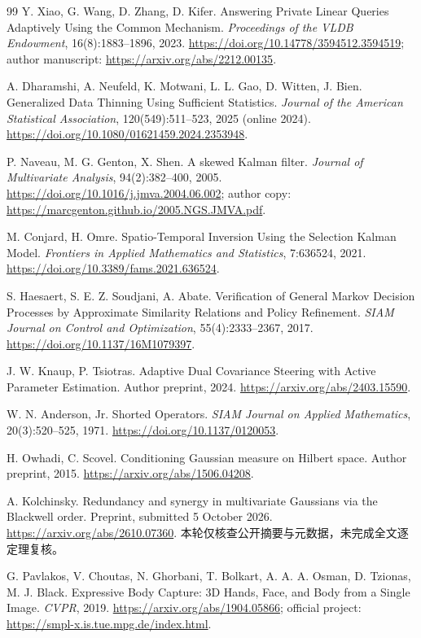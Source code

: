 \documentclass[UTF8,fontset=fandol,11pt,a4paper]{ctexart}
\theoremstyle{definition}\newtheorem{definition}[theorem]{定义}\newtheorem{assumption}[theorem]{条件}
\numberwithin{equation}{section}
\begin{document}
\begin{thebibliography}{99}
\small
{} Y. Xiao, G. Wang, D. Zhang, D. Kifer.
Answering Private Linear Queries Adaptively Using the Common Mechanism.
\emph{Proceedings of the VLDB Endowment}, 16(8):1883--1896, 2023.
\url{https://doi.org/10.14778/3594512.3594519}; author manuscript: \url{https://arxiv.org/abs/2212.00135}.

 A. Dharamshi, A. Neufeld, K. Motwani, L. L. Gao, D. Witten, J. Bien.
Generalized Data Thinning Using Sufficient Statistics.
\emph{Journal of the American Statistical Association}, 120(549):511--523, 2025 (online 2024).
\url{https://doi.org/10.1080/01621459.2024.2353948}.

 P. Naveau, M. G. Genton, X. Shen.
A skewed Kalman filter. \emph{Journal of Multivariate Analysis}, 94(2):382--400, 2005.
\url{https://doi.org/10.1016/j.jmva.2004.06.002}; author copy: \url{https://marcgenton.github.io/2005.NGS.JMVA.pdf}.

 M. Conjard, H. Omre.
Spatio-Temporal Inversion Using the Selection Kalman Model.
\emph{Frontiers in Applied Mathematics and Statistics}, 7:636524, 2021.
\url{https://doi.org/10.3389/fams.2021.636524}.

 S. Haesaert, S. E. Z. Soudjani, A. Abate.
Verification of General Markov Decision Processes by Approximate Similarity Relations and Policy Refinement.
\emph{SIAM Journal on Control and Optimization}, 55(4):2333--2367, 2017.
\url{https://doi.org/10.1137/16M1079397}.

 J. W. Knaup, P. Tsiotras.
Adaptive Dual Covariance Steering with Active Parameter Estimation.
Author preprint, 2024.
\url{https://arxiv.org/abs/2403.15590}.

 W. N. Anderson, Jr.
Shorted Operators. \emph{SIAM Journal on Applied Mathematics}, 20(3):520--525, 1971.
\url{https://doi.org/10.1137/0120053}.

 H. Owhadi, C. Scovel.
Conditioning Gaussian measure on Hilbert space. Author preprint, 2015.
\url{https://arxiv.org/abs/1506.04208}.

 A. Kolchinsky.
Redundancy and synergy in multivariate Gaussians via the Blackwell order.
Preprint, submitted 5 October 2026.
\url{https://arxiv.org/abs/2610.07360}.
本轮仅核查公开摘要与元数据，未完成全文逐定理复核。

 G. Pavlakos, V. Choutas, N. Ghorbani, T. Bolkart, A. A. A. Osman, D. Tzionas, M. J. Black.
Expressive Body Capture: 3D Hands, Face, and Body from a Single Image.
\emph{CVPR}, 2019.
\url{https://arxiv.org/abs/1904.05866}; official project: \url{https://smpl-x.is.tue.mpg.de/index.html}.


\end{thebibliography}
\end{document}
